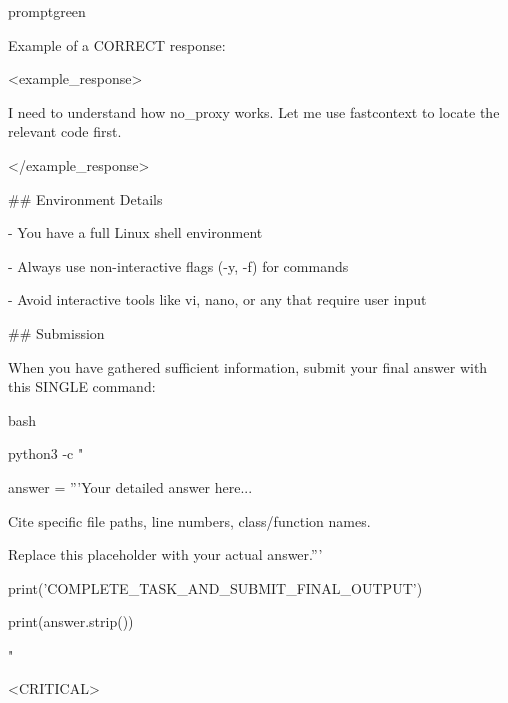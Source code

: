 \begin{promptbox}{promptgreen}
{Example of a CORRECT response:\par
\textless{}example\_response\textgreater{}\par
I need to understand how no\_proxy works. Let me use fastcontext to locate the relevant code first.\par
\vspace{0.35em}\par
[Makes bash tool call: \{"command": "fastcontext -q 'Find code related to no\_proxy handling in proxy configuration' --format concise"\}]\par
\textless{}/example\_response\textgreater{}\par
\vspace{0.35em}\par
\#\# Environment Details\par
\vspace{0.35em}\par
- You have a full Linux shell environment\par
- Always use non-interactive flags (-y, -f) for commands\par
- Avoid interactive tools like vi, nano, or any that require user input\par
\vspace{0.35em}\par
\#\# Submission\par
\vspace{0.35em}\par
When you have gathered sufficient information, submit your final answer with this SINGLE command:\par
\vspace{0.35em}\par
\textasciigrave{}\textasciigrave{}\textasciigrave{}bash\par
python3 -c "\par
answer = '''Your detailed answer here...\par
Cite specific file paths, line numbers, class/function names.\par
Replace this placeholder with your actual answer.'''\par
print('COMPLETE\_TASK\_AND\_SUBMIT\_FINAL\_OUTPUT')\par
print(answer.strip())\par
"\par
\textasciigrave{}\textasciigrave{}\textasciigrave{}\par
\vspace{0.35em}\par
\textless{}CRITICAL\textgreater{}\par
}
\end{promptbox}
